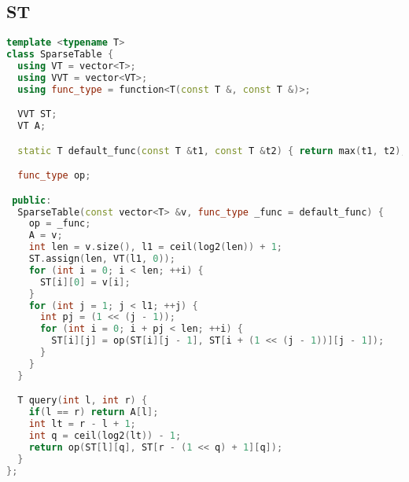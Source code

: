 \subsection{ST}
\begin{lstlisting}[language=c++]
template <typename T>
class SparseTable {
  using VT = vector<T>;
  using VVT = vector<VT>;
  using func_type = function<T(const T &, const T &)>;

  VVT ST;
  VT A;

  static T default_func(const T &t1, const T &t2) { return max(t1, t2); }

  func_type op;

 public:
  SparseTable(const vector<T> &v, func_type _func = default_func) {
    op = _func;
    A = v;
    int len = v.size(), l1 = ceil(log2(len)) + 1;
    ST.assign(len, VT(l1, 0));
    for (int i = 0; i < len; ++i) {
      ST[i][0] = v[i];
    }
    for (int j = 1; j < l1; ++j) {
      int pj = (1 << (j - 1));
      for (int i = 0; i + pj < len; ++i) {
        ST[i][j] = op(ST[i][j - 1], ST[i + (1 << (j - 1))][j - 1]);
      }
    }
  }

  T query(int l, int r) {
    if(l == r) return A[l];
    int lt = r - l + 1;
    int q = ceil(log2(lt)) - 1;
    return op(ST[l][q], ST[r - (1 << q) + 1][q]);
  }
};
\end{lstlisting}